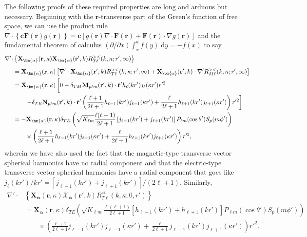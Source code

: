 The following proofs of these required properties are long and arduous but necessary. Beginning with the $\mathbf{r}$-transverse part of the Green's function of free space, we can use the product rule $\nabla\cdot\left\{\mathbf{c}\mathbf{F}(\mathbf{r})g(\mathbf{r})\right\} = \mathbf{c}\left[g(\mathbf{r})\nabla\cdot\mathbf{F}(\mathbf{r}) + \mathbf{F}(\mathbf{r})\cdot\nabla g(\mathbf{r})\right]$ and the fundamental theorem of calculus $(\partial/\partial x)\int_x^a f(y)\;\mathrm{d}y = -f(x)$ to say
\begin{equation}
\begin{split}
\nabla'\cdot&\left\{\mathbf{X}_{\bm{\alpha}}(\mathbf{r},\kappa)\mathbf{X}_{\bm{\alpha}}(\mathbf{r}',k)R_{T\ell}^{><}(k,\kappa;r',\infty)\right\}\\[0.5em]
&= \mathbf{X}_{\bm{\alpha}}(\mathbf{r},\kappa)\left[\nabla'\cdot\mathbf{X}_{\bm{\alpha}}(\mathbf{r}',k)R_{T\ell}^{><}(k,\kappa;r',\infty) + \mathbf{X}_{\bm{\alpha}}(\mathbf{r}',k)\cdot\nabla'R_{M\ell}^{><}(k,\kappa;r',\infty)\right]\\
&= \mathbf{X}_{\bm{\alpha}}(\mathbf{r},\kappa)\left[ \vphantom{\frac{\ell}{2\ell + 1}} 0 - \delta_{TM}\mathbf{M}_{p\ell m}(\mathbf{r}',k)\cdot\hat{\mathbf{r}}'h_\ell(kr')j_\ell(\kappa r')r'^2\right.\\
&\left.\qquad- \delta_{TE}\mathbf{N}_{p\ell m}(\mathbf{r}',k)\cdot\hat{\mathbf{r}}'\left(\frac{\ell + 1}{2\ell + 1}h_{\ell - 1}(kr')j_{\ell - 1}(\kappa r') + \frac{\ell}{2\ell + 1}h_{\ell + 1}(kr')j_{\ell + 1}(\kappa r')\right)r'^2\right]\\
&= -\mathbf{X}_{\bm{\alpha}}(\mathbf{r},\kappa)\delta_{TE}\left(\sqrt{K_{\ell m}}\frac{\ell(\ell + 1)}{2\ell + 1}\left[j_{\ell - 1}(kr') + j_{\ell + 1}(kr')\right]P_{\ell m}(\cos\theta')S_p(m\phi')\right)\\
&\qquad\times\left(\frac{\ell + 1}{2\ell + 1}h_{\ell - 1}(kr')j_{\ell - 1}(\kappa r') + \frac{\ell}{2\ell + 1}h_{\ell + 1}(kr')j_{\ell + 1}(\kappa r')\right)r'^2,
\end{split}
\end{equation}
wherein we have also used the fact that the magnetic-type transverse vector spherical harmonics have no radial component and that the electric-type transverse vector spherical harmonics have a radial component that goes like $j_{\ell}(kr')/kr' = [j_{\ell - 1}(kr') + j_{\ell + 1}(kr')]/(2\ell + 1)$. Similarly,
\begin{equation}
\begin{split}
\nabla'\cdot&\left\{\mathbf{X}_{\bm{\alpha}}(\mathbf{r},\kappa)\bm{\mathcal{X}}_{\bm{\alpha}}(\mathbf{r}',k)R_{T\ell}^\ll(k,\kappa;0,r')\right\}\\
&= \mathbf{X}_{\bm{\alpha}}(\mathbf{r},\kappa)\delta_{TE}\left(\sqrt{K_{\ell m}}\frac{\ell(\ell + 1)}{2\ell + 1}\left[h_{\ell - 1}(kr') + h_{\ell + 1}(kr')\right]P_{\ell m}(\cos\theta')S_p(m\phi')\right)\\
&\qquad\times\left(\frac{\ell + 1}{2\ell + 1}j_{\ell - 1}(kr')j_{\ell - 1}(\kappa r') + \frac{\ell}{2\ell + 1}j_{\ell + 1}(kr')j_{\ell + 1}(\kappa r')\right)r'^2.
\end{split}
\end{equation}
